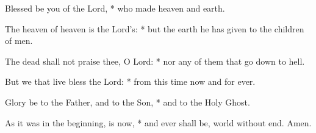 \item Blessed be you of the Lord, * who made heaven and earth.
\item The heaven of heaven is the Lord’s: * but the earth he has given to the children of men.
\item The dead shall not praise thee, O Lord: * nor any of them that go down to hell.
\item But we that live bless the Lord: * from this time now and for ever.
\item Glory be to the Father, and to the Son, * and to the Holy Ghost.
\item As it was in the beginning, is now, * and ever shall be, world without end. Amen.